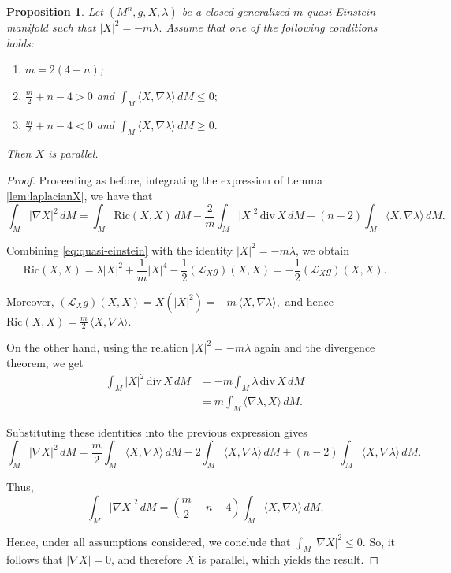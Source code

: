 \documentclass[a4paper, 12pt]{amsart}
\newtheorem{proposition}[theorem]{Proposition}
\theoremstyle{definition}
\numberwithin{figure}{section}
\begin{document}
\begin{proposition}\label{prop:parallel}
Let $(M^n,g,X,\lambda)$ be a closed generalized $m$-quasi-Einstein manifold such that
$
|X|^2 = -m\lambda.
$
Assume that one of the following conditions holds:
\begin{enumerate}
\item $m = 2(4-n)$;

\item $\displaystyle \frac{m}{2} + n - 4 > 0$ and 
$ 
\int_M \langle X, \nabla \lambda \rangle \, dM \leq 0;
$

\item $\displaystyle \frac{m}{2} + n - 4 < 0$ and 
$
\int_M \langle X, \nabla \lambda \rangle \, dM \geq 0.
$
\end{enumerate}
Then $X$ is parallel.
\end{proposition}
\begin{proof}
Proceeding as before, integrating the expression of Lemma \ref{lem:laplacianX}, we have that
\begin{equation*}
\int_M |\nabla X|^2 \, dM
= \int_M \mathrm{Ric}(X,X)\, dM
- \frac{2}{m}\int_M |X|^2 \,\mathrm{div}\,X \, dM
+ (n-2)\int_M \langle X,\nabla \lambda\rangle \, dM.
\end{equation*}

Combining \eqref{eq:quasi-einstein} with the identity $|X|^2 = -m\lambda$, we obtain
\begin{equation*}
\mathrm{Ric}(X,X) = \lambda |X|^2 + \frac{1}{m}|X|^4 
- \frac{1}{2}(\mathcal{L}_X g)(X,X)
= - \frac{1}{2}(\mathcal{L}_X g)(X,X).
\end{equation*}

Moreover,
$ 
(\mathcal{L}_X g)(X,X) = X(|X|^2) = -m\,\langle X,\nabla \lambda\rangle,
$ 
and hence
$ 
\mathrm{Ric}(X,X) = \frac{m}{2}\,\langle X,\nabla \lambda\rangle.
$ 

On the other hand, using the relation $|X|^2 = -m\lambda$  again  and the divergence theorem, we get
\begin{align*}
\int_M |X|^2 \,\mathrm{div}\,X \, dM
&= -m \int_M \lambda \,\mathrm{div}\,X \, dM \\
&= m \int_M \langle \nabla \lambda, X \rangle \, dM.
\end{align*}

Substituting these identities into the previous expression gives
\begin{equation*}
\int_M |\nabla X|^2 \, dM
= \frac{m}{2}\int_M \langle X,\nabla \lambda\rangle \, dM
- 2 \int_M \langle X,\nabla \lambda\rangle \, dM
+ (n-2)\int_M \langle X,\nabla \lambda\rangle \, dM.
\end{equation*}

Thus,
\begin{equation*}
\int_M |\nabla X|^2 \, dM
= \left(\frac{m}{2} + n - 4 \right)
\int_M \langle X,\nabla \lambda\rangle \, dM.
\end{equation*}

Hence, under all assumptions considered, we conclude that
$
\int_M |\nabla X|^2 \leq 0.
$
So, it follows that $|\nabla X|=0$, and therefore $X$ is parallel, which yields the result.
\end{proof}
\end{document}

